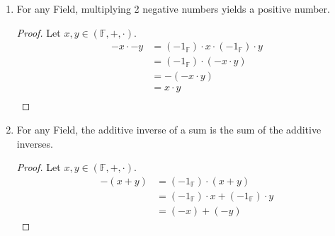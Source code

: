 \documentclass{article}
\begin{document}
\begin{enumerate}
\begin{proof}
					$\Rightarrow -1_\mathbb{F} \cdot x + x = -1_\mathbb{F} \cdot x + 1_\mathbb{F} \cdot x$. \\
					$\Rightarrow -1_\mathbb{F} \cdot x + x = (-1_\mathbb{F} \cdot + 1_\mathbb{F}) \cdot x$. \\
					$\Rightarrow -1_\mathbb{F} \cdot x + x = 0_\mathbb{F} \cdot x$. \\
					$\Rightarrow -1_\mathbb{F} \cdot x + x = 0_\mathbb{F}$. \\

					$\Rightarrow x \cdot -1_\mathbb{F} + x = x \cdot -1_\mathbb{F} + x \cdot 1_\mathbb{F}$. \\
					$\Rightarrow x \cdot -1_\mathbb{F} + x = x \cdot (-1_\mathbb{F} \cdot + 1_\mathbb{F})$. \\
					$\Rightarrow x \cdot -1_\mathbb{F} + x = x \cdot 0_\mathbb{F}$. \\
					$\Rightarrow x \cdot -1_\mathbb{F} + x = 0_\mathbb{F}$. \\

					$\Rightarrow -x = -1_\mathbb{F} \cdot x = x \cdot -1_\mathbb{F}$, since all three are solutions to same equation:
					$$x + y = z: y = x, z = 0_\mathbb{F}$$
				\end{proof}

				\item For any Field, multiplying 2 negative numbers yields a positive number. \\
				\begin{proof}
					Let $x, y \in (\mathbb{F}, +, \cdot)$.
					\begin{align*}
						-x \cdot -y &= (-1_\mathbb{F}) \cdot x \cdot (-1_\mathbb{F}) \cdot y \\
									&= (-1_\mathbb{F}) \cdot (-x \cdot  y) \\
									&= -(-x \cdot  y) \\
									&= x \cdot  y \\
					\end{align*}
				\end{proof}

				\item For any Field, the additive inverse of a sum is the sum of the additive inverses. \\
				\begin{proof}
					Let $x, y \in (\mathbb{F}, +, \cdot)$.
					\begin{align*}
						-(x + y) &= (-1_\mathbb{F}) \cdot (x + y) \\
									&= (-1_\mathbb{F}) \cdot x + (-1_\mathbb{F}) \cdot  y \\
									&= (-x) + (-y)
					\end{align*}
				\end{proof}


\end{enumerate}
\end{document}
